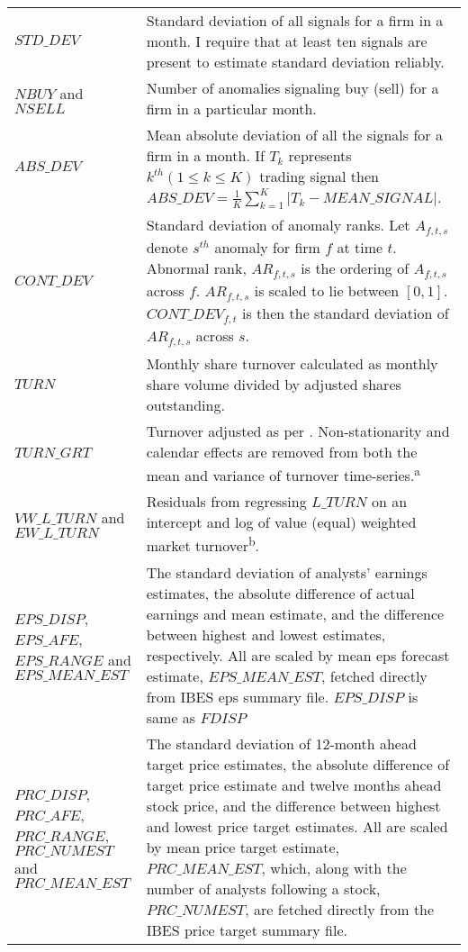 \begin{ThreePartTable}
\begin{spacing}{1.0}
\begin{longtable}[t]{>{\raggedright\arraybackslash}p{4.2cm}>{\raggedright\arraybackslash}p{10.5cm}}
\addlinespace
$STD\_DEV$ & Standard deviation of all signals for a firm in a month. I require that at least ten signals are present to estimate standard deviation reliably.\\
\addlinespace
$NBUY$ and $NSELL$ & Number of anomalies signaling buy (sell) for a firm in a particular month.\\
\addlinespace
$ABS\_DEV$ & Mean absolute deviation of all the signals for a firm in a month. If $T_k$ represents $k^{th} (1 \leq k \leq K)$ trading signal then $ABS\_DEV = \frac{1}{K} \sum_{k=1}^{K} \lvert T_k - MEAN\_SIGNAL \rvert$.\\
\addlinespace
$CONT\_DEV$ & Standard deviation of anomaly ranks. Let $A_{f,t,s}$ denote $s^{th}$ anomaly for firm $f$ at time $t$. Abnormal rank, $AR_{f,t,s}$ is the ordering of $A_{f,t,s}$ across $f$. $AR_{f,t,s}$ is scaled to lie between $[0,1]$. $CONT\_DEV_{f,t}$ is then the standard deviation of $AR_{f,t,s}$ across $s$.\\
\addlinespace
$TURN$ & Monthly share turnover calculated as monthly share volume divided by adjusted shares outstanding.\\
\addlinespace
$TURN\_GRT$ & Turnover adjusted as per \cite{grt1992}. Non-stationarity and calendar effects are removed from both the mean and variance of turnover time-series.\textsuperscript{a}\\
\addlinespace
$VW\_L\_TURN$ and $EW\_L\_TURN$ & Residuals from regressing $L\_TURN$ on an intercept and log of value (equal) weighted market turnover\textsuperscript{b}.\\
\addlinespace
$EPS\_DISP$, $EPS\_AFE$, $EPS\_RANGE$ and $EPS\_MEAN\_EST$ & The standard deviation of analysts' earnings estimates, the absolute difference of actual earnings and mean estimate, and the difference between highest and lowest estimates, respectively. All are scaled by mean eps forecast estimate, $EPS\_MEAN\_EST$, fetched directly from IBES eps summary file. $EPS\_DISP$ is same as $FDISP$\\
\addlinespace
$PRC\_DISP$, $PRC\_AFE$, $PRC\_RANGE$, $PRC\_NUMEST$ and $PRC\_MEAN\_EST$ & The standard deviation of 12-month ahead target price estimates, the absolute difference of target price estimate and twelve months ahead stock price, and the difference between highest and lowest price target estimates. All are scaled by mean price target estimate, $PRC\_MEAN\_EST$, which, along with the number of analysts following a stock, $PRC\_NUMEST$, are fetched directly from the IBES price target summary file.\\

\end{longtable}
\end{spacing}
\end{ThreePartTable}

